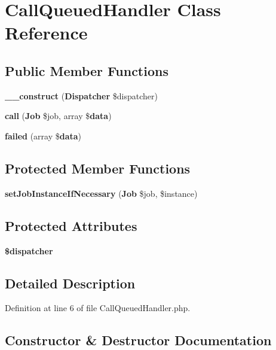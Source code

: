 \section{Call\+Queued\+Handler Class Reference}
\label{class_illuminate_1_1_queue_1_1_call_queued_handler}
\subsection*{Public Member Functions}
\begin{DoxyCompactItemize}
\item 
{\bf \+\_\+\+\_\+construct} ({\bf Dispatcher} \$dispatcher)
\item 
{\bf call} ({\bf Job} \$job, array \${\bf data})
\item 
{\bf failed} (array \${\bf data})
\end{DoxyCompactItemize}
\subsection*{Protected Member Functions}
\begin{DoxyCompactItemize}
\item 
{\bf set\+Job\+Instance\+If\+Necessary} ({\bf Job} \$job, \$instance)
\end{DoxyCompactItemize}
\subsection*{Protected Attributes}
\begin{DoxyCompactItemize}
\item 
{\bf \$dispatcher}
\end{DoxyCompactItemize}


\subsection{Detailed Description}


Definition at line 6 of file Call\+Queued\+Handler.\+php.



\subsection{Constructor \& Destructor Documentation}
